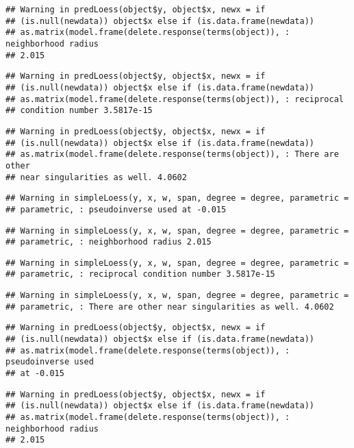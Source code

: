 \documentclass[]{article}
\begin{document}
\begin{verbatim}
## Warning in predLoess(object$y, object$x, newx = if
## (is.null(newdata)) object$x else if (is.data.frame(newdata))
## as.matrix(model.frame(delete.response(terms(object)), : neighborhood radius
## 2.015
\end{verbatim}

\begin{verbatim}
## Warning in predLoess(object$y, object$x, newx = if
## (is.null(newdata)) object$x else if (is.data.frame(newdata))
## as.matrix(model.frame(delete.response(terms(object)), : reciprocal
## condition number 3.5817e-15
\end{verbatim}

\begin{verbatim}
## Warning in predLoess(object$y, object$x, newx = if
## (is.null(newdata)) object$x else if (is.data.frame(newdata))
## as.matrix(model.frame(delete.response(terms(object)), : There are other
## near singularities as well. 4.0602
\end{verbatim}

\begin{verbatim}
## Warning in simpleLoess(y, x, w, span, degree = degree, parametric =
## parametric, : pseudoinverse used at -0.015
\end{verbatim}

\begin{verbatim}
## Warning in simpleLoess(y, x, w, span, degree = degree, parametric =
## parametric, : neighborhood radius 2.015
\end{verbatim}

\begin{verbatim}
## Warning in simpleLoess(y, x, w, span, degree = degree, parametric =
## parametric, : reciprocal condition number 3.5817e-15
\end{verbatim}

\begin{verbatim}
## Warning in simpleLoess(y, x, w, span, degree = degree, parametric =
## parametric, : There are other near singularities as well. 4.0602
\end{verbatim}

\begin{verbatim}
## Warning in predLoess(object$y, object$x, newx = if
## (is.null(newdata)) object$x else if (is.data.frame(newdata))
## as.matrix(model.frame(delete.response(terms(object)), : pseudoinverse used
## at -0.015
\end{verbatim}

\begin{verbatim}
## Warning in predLoess(object$y, object$x, newx = if
## (is.null(newdata)) object$x else if (is.data.frame(newdata))
## as.matrix(model.frame(delete.response(terms(object)), : neighborhood radius
## 2.015
\end{verbatim}
\end{document}
